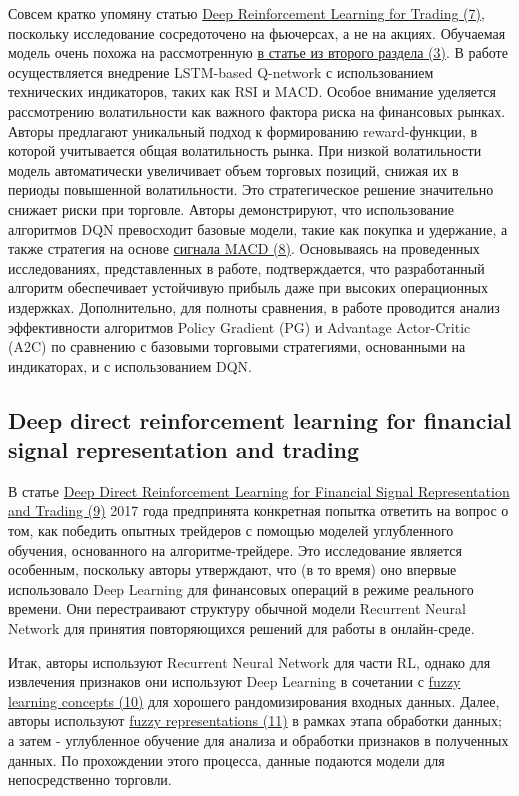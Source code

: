 \documentclass[a4paper,14pt]{extarticle}
\newcommand{\bibref}[3]{\hyperlink{#1}{#2 (#3)}} %
\begin{document}
Совсем кратко упомяну статью \bibref{7}{Deep Reinforcement Learning for Trading}{7}, поскольку исследование сосредоточено на фьючерсах, а не на акциях. 
Обучаемая модель очень похожа на рассмотренную \bibref{3}{в статье из второго раздела}{3}. 
В работе осуществляется внедрение LSTM-based Q-network с использованием технических индикаторов, таких как RSI и MACD. Особое внимание уделяется рассмотрению волатильности как важного фактора риска на финансовых рынках. Авторы предлагают уникальный подход к формированию reward-функции, в которой учитывается общая волатильность рынка. При низкой волатильности модель автоматически увеличивает объем торговых позиций, снижая их в периоды повышенной волатильности. Это стратегическое решение значительно снижает риски при торговле.
Авторы демонстрируют, что использование алгоритмов DQN превосходит базовые модели, такие как покупка и удержание, а также стратегия на основе \bibref{8}{сигнала MACD}{8}. Основываясь на проведенных исследованиях, представленных в работе, подтверждается, что разработанный алгоритм обеспечивает устойчивую прибыль даже при высоких операционных издержках. Дополнительно, для полноты сравнения, в работе проводится анализ эффективности алгоритмов Policy Gradient (PG) и Advantage Actor-Critic (A2C) по сравнению с базовыми торговыми стратегиями, основанными на индикаторах, и с использованием DQN.

\subsection{Deep direct reinforcement learning for financial signal representation and trading}

В статье \bibref{9}{Deep Direct Reinforcement Learning for Financial Signal Representation and Trading}{9} 2017 года предпринята конкретная попытка ответить на вопрос о том, как победить опытных трейдеров с помощью моделей углубленного обучения, основанного на алгоритме-трейдере. Это исследование является особенным, поскольку авторы утверждают, что (в то время) оно впервые использовало Deep Learning для финансовых операций в режиме реального времени. Они перестраивают структуру обычной модели Recurrent Neural Network для принятия повторяющихся решений для работы в онлайн-среде. 

Итак, авторы используют Recurrent Neural Network для части RL, однако для извлечения признаков они используют Deep Learning в сочетании с \bibref{10}{fuzzy learning concepts}{10} для хорошего рандомизирования входных данных. Далее, авторы используют \bibref{11}{fuzzy representations}{11} в рамках этапа обработки данных; а затем - углубленное обучение для анализа и обработки признаков в полученных данных. По прохождении этого процесса, данные подаются модели для непосредственно торговли.
\end{document}

